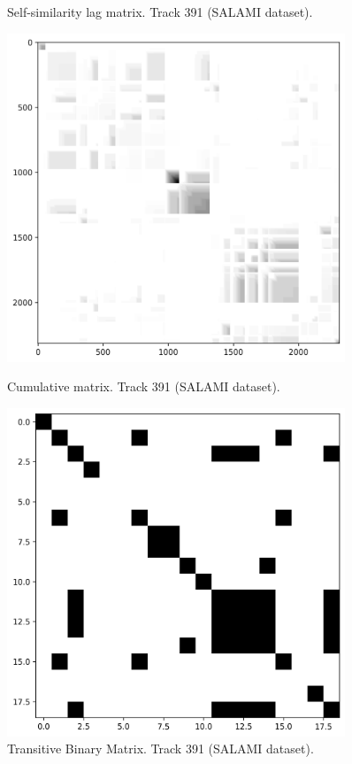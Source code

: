 \begin{figure}[ht]
\begin{minipage}{0.45\textwidth}
        \caption[Track 391 (SALAMI dataset) Self-similarity lag matrix]{Self-similarity lag matrix. Track 391 (SALAMI dataset).}
    \end{minipage}
    \vfill
    \begin{minipage}{0.45\textwidth}
        \centering
        \includegraphics[width=0.9\textwidth]{figures/images/salami_391_Q_matrix.png} %
        \caption[Track 391 (SALAMI dataset). Q-matrix]{Cumulative matrix. Track 391 (SALAMI dataset).}
    \end{minipage}\hfill
    \begin{minipage}{0.45\textwidth}
        \centering
        \includegraphics[width=0.9\textwidth]{figures/images/salami_391_binary transitive matrix.png} %
        \caption[Track 391 (SALAMI dataset). Transitive Binary Similarity Matrix]{Transitive Binary Matrix. Track 391 (SALAMI dataset).}
    \end{minipage}
\end{figure}

